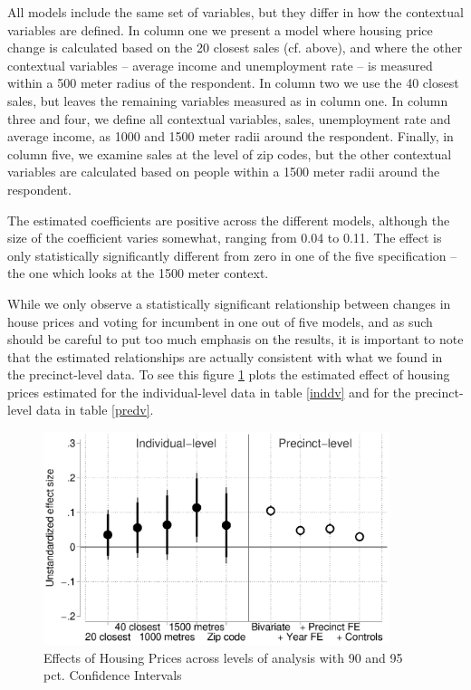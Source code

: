 \documentclass[12pt,a4paper]{article}
\begin{document}
	All models include the same set of variables, but they differ in how the contextual variables are defined. In column one we present a model where housing price change is calculated based on the 20 closest sales (cf. above), and where the other contextual variables -- average income and unemployment rate -- is measured within a 500 meter radius of the respondent. In column two we use the 40 closest sales, but leaves the remaining variables measured as in column one. In column three and four, we define all contextual variables, sales, unemployment rate and average income, as 1000 and 1500 meter radii around the respondent. Finally, in column five, we examine sales at the level of zip codes, but the other contextual variables are calculated based on people within a 1500 meter radii around the respondent.
	
	
	
	The estimated coefficients are positive across the different models, although the size of the coefficient varies somewhat, ranging from 0.04 to 0.11. The effect is only statistically significantly different from zero in one of the five specification -- the one which looks at the 1500 meter context.
	
	While we only observe a statistically significant relationship between changes in house prices and voting for incumbent in one out of five models, and as such should be careful to put too much emphasis on the results, it is important to note that the estimated relationships are actually consistent with what we found in the precinct-level data. To see this figure \ref{comparison} plots the estimated effect of housing prices estimated for the individual-level data in table \ref{inddv}  and for the precinct-level data in table \ref{predv}.
	
	\begin{figure}[htbp!]
		\includegraphics[width=0.9\textwidth]{../figures/comparison.eps}
		\centering
		\caption{Effects of Housing Prices across levels of analysis with 90  and 95 pct. Confidence Intervals}\label{comparison}
	\end{figure}
	
\end{document}
